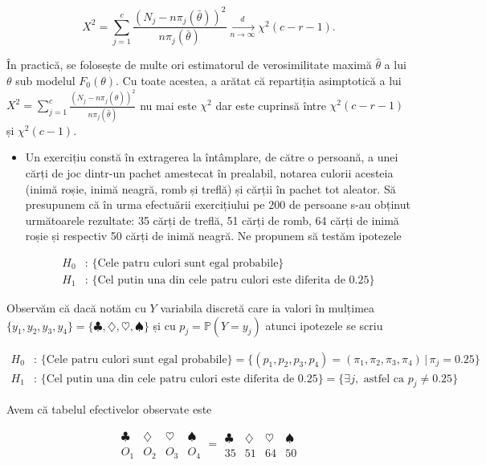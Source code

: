 \documentclass[]{article}
\newenvironment{frshaded*}{%
  \def\FrameCommand{\fboxrule=\FrameRule\fboxsep=\FrameSep \fcolorbox{framecolor}{shadecolor1}}%
  \MakeFramed {\advance\hsize-\width \FrameRestore}}%
{\endMakeFramed}
\newenvironment{rmdblock}[1]
  {\begin{frshaded*}
  \begin{itemize}
  \renewcommand{\labelitemi}{
    \raisebox{-.7\height}[0pt][0pt]{
      {\setkeys{Gin}{width=2em,keepaspectratio}\texttt{[image: images/icons/\#1]}}
    }
  }
  \item
  }
  {
  \end{itemize}
  \end{frshaded*}
  }
\newenvironment{rmdexercise}
  {\begin{rmdblock}{exercise}}
  {\end{rmdblock}}
\begin{document}
\[
  X^2 = \sum_{j = 1}^{c}\frac{\left(N_{j} - n \pi_j(\bar{\theta})\right)^2}{n \pi_j(\bar{\theta})}\underset{n\to\infty}{\overset{d}{\longrightarrow}} \chi^2(c-r-1).
\]

În practică, se folosește de multe ori estimatorul de verosimilitate
maximă \(\hat{\theta}\) a lui \(\theta\) sub modelul \(F_0(\theta)\). Cu
toate acestea, \citep{Lehmann1954} a arătat că repartiția asimptotică a
lui
\(X^2 = \sum_{j = 1}^{c}\frac{\left(N_{j} - n \pi_j(\hat{\theta})\right)^2}{n \pi_j(\hat{\theta})}\)
nu mai este \(\chi^2\) dar este cuprinsă între \(\chi^2(c-r-1)\) și
\(\chi^2(c-1)\).

\begin{rmdexercise}
Un exercițiu constă în extragerea la întâmplare, de către o persoană, a
unei cărți de joc dintr-un pachet amestecat în prealabil, notarea
culorii acesteia (inimă roșie, inimă neagră, romb și treflă) și cărții
în pachet tot aleator. Să presupunem că în urma efectuării exercițiului
pe \(200\) de persoane s-au obținut următoarele rezultate: 35 cărți de
treflă, 51 cărți de romb, 64 cărți de inimă roșie și respectiv 50 cărți
de inimă neagră. Ne propunem să testăm ipotezele

\begin{align*}
  H_0&:\,\{\text{Cele patru culori sunt egal probabile}\}\\
  H_1&:\,\{\text{Cel putin una din cele patru culori este diferita de 0.25}\}
\end{align*}
\end{rmdexercise}

Observăm că dacă notăm cu \(Y\) variabila discretă care ia valori în
mulțimea
\(\{y_1,y_2,y_3,y_4\} = \{\clubsuit, \diamondsuit, \heartsuit, \spadesuit\}\)
și cu \(p_j = \mathbb{P}(Y = y_j)\) atunci ipotezele se scriu

\begin{align*}
  H_0&:\,\{\text{Cele patru culori sunt egal probabile}\} = \{(p_1,p_2,p_3,p_4) = (\pi_1, \pi_2, \pi_3, \pi_4) \,|\, \pi_j = 0.25\}\\
  H_1&:\,\{\text{Cel putin una din cele patru culori este diferita de 0.25}\} = \{\exists j, \text{ astfel ca } p_j\neq 0.25\}
\end{align*}

Avem că tabelul efectivelor observate este

\[
\begin{array}{c|c|c|c}
  \clubsuit & \diamondsuit & \heartsuit & \spadesuit \\
  \hline
  O_1 & O_2 & O_3 & O_4
\end{array} 
=
\begin{array}{c|c|c|c}
  \clubsuit & \diamondsuit & \heartsuit & \spadesuit \\
  \hline
  35 & 51 & 64 & 50
\end{array}
\]
\end{document}
